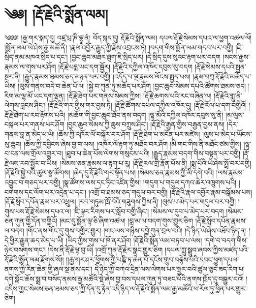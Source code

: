 \chapter{༄༅། །རྡོ་རྗེའི་སྨོན་ལམ།}༄༅༅། །རྒྱ་གར་སྐད་དུ། བཛྲ་པྲ་ཎི་དྷཱ་ནཾ། བོད་སྐད་དུ། རྡོ་རྗེའི་སྨོན་ལམ། དཔལ་རྡོ་རྗེ་སེམས་དཔའ་ལ་ཕྱག་འཚལ་ལོ། །སྨོན་ལམ་ཡེ་ཤེས་རྒྱ་མཚོ་ནི། །རྣལ་འབྱོར་རྒྱུད་ཀྱི་རྗེས་འབྲངས་ཏེ། །བདག་གིས་སྨོན་ལམ་གདབ་པར་བགྱི། །ཇི་སྲིད་ནམ་མཁའ་སྲིད་པ་དང་། །བྱང་ཆུབ་མཐར་ཐུག་ཇི་སྲིད་པར། །དེ་སྲིད་དུས་སུའང་རྟག་པར་བདག །སངས་རྒྱས་རྣམས་ལ་གུས་པར་ཤོག །རྡོ་རྗེ་པདྨ་ཡང་དག་སྦྱོར། །རྡོ་རྗེའི་དཀྱིལ་འཁོར་དབུས་སུ་བདག །རྡོ་རྗེ་སེམས་དཔའི་སྤྱན་སྔར་ནི། །རྒྱུད་རྣམས་ཐམས་ཅད་མཉན་པར་བགྱི། །འདོད་པ་ལྔ་རྣམས་ལོངས་སྤྱད་པས། །རྣམ་བཀྲ་རྡོ་རྗེའི་མཆོད་པ་ཡིས། །ལུས་གནས་བདེ་བ་ཆེན་པོ་ལ། །སྐྱེ་བ་ཀུན་ཏུ་མཆོད་པར་ཤོག །བྱང་ཆུབ་སེམས་དཔའི་ཚོགས་ཐམས་ཅད། །རིག་མ་ལྷ་མོ་ཡང་དག་ལྡན། །རྡོ་རྗེ་ཐེག་པར་གནས་སེམས་ཀྱིས། །རྡོ་རྗེ་ཆགས་པའི་རང་བཞིན་ལ། །རྡོ་རྗེའི་གླུ་ནི་ལེགས་བླངས་ཤིང་། །རྡོ་རྗེའི་གར་གྱིས་གར་བྱས་ཏེ། །རྡོ་རྗེ་ཚོགས་དཔལ་དཀྱིལ་འཁོར་དུ། །རྡོ་རྗེ་རོལ་པ་དག་བགྱིའོ། །རྡོ་རྗེ་ཐེག་པ་རབ་རྟོགས་པའི། །མཆོག་གི་བྱང་ཆུབ་ཐོབ་ནས་བདག །ལྷ་མོའི་དཀྱིལ་འཁོར་དབུས་སུ་ནི། །མ་ལུས་བསྐལ་པར་གནས་པར་ཤོག །བྱང་ཆུབ་སེམས་ཀྱི་ཆུས་བཀྲུས་ཤིང་། །རྡོ་རྗེའི་རྒྱན་གྱིས་བརྒྱན་བྱས་ནས། །དེར་གནས་བླ་ན་མེད་པ་ཡི། །ཆོས་ཀྱི་འཁོར་ལོ་བསྐོར་བར་ཤོག །རྡོ་རྗེ་ཐེག་པ་མངོན་པར་མཛེས། །ལུས་པ་མེད་པ་ཡོངས་སུ་ཆུབ། །ཆོས་ཀྱི་དབྱིངས་ཞེས་བྱ་བ་ལས། །འཁོར་ལོ་རྟག་ཏུ་མཐོང་བར་ཤོག །མི་གང་གིས་ནི་མཐོང་ཙམ་གྱིས། །ལྟ་བ་ངན་ལས་གྲོལ་འགྱུར་བ། །ཐུབ་པ་ཆེན་པོས་ལེགས་གསུངས་པའི། །རྒྱུད་རྣམས་བདག་གིས་བསྟན་པར་བགྱི། །རྡོ་རྗེ་ལས་རབ་སྦྱོར་བ་ཡིས། །སེམས་ཅན་རྣམས་ལ་རྟག་པ་རུ། །རྡོ་རྗེ་རལ་གྲི་རྣོན་པོས་ནི། །སྨྲ་པོའི་ཡེ་ཤེས་སྤྲོ་བར་བགྱི། །རྡོ་རྗེའི་སྐྱེ་བའི་ཚུལ་སྣ་ཚོགས། །ཆེད་དུ་རྡོ་རྗེའི་གར་སྟོན་པས། །སེམས་ཅན་རྣམས་ཀྱི་མི་དགེ་བའི། །ལས་རྣམས་འབྱུང་བ་གཅད་པར་བགྱི། །སྣ་ཚོགས་ལས་དང་ཏིང་འཛིན་གྱིས། །གདུག་པ་གདུལ་དཀའ་ཆེར་འཁྲུགས་པའི། །བགེགས་དང་ལོག་པར་འདྲེན་པ་དང་། །འགྲོ་བ་ཐམས་ཅད་གདུལ་བར་བགྱི། །རྡོ་རྗེའི་རྣལ་འབྱོར་རྣམ་བསྒོམས་པས། །རྡོ་རྗེ་སློབ་དཔོན་རྣམ་པར་འཕྲུལ། །རབ་གཏུམ་ཁྲོ་བོའི་གཟུགས་ཀྱིས་ནི། །ལུས་པ་མེད་པར་གདུལ་བར་བགྱི། །
གུས་པས་རྡོ་རྗེ་སེམས་དཔའ་ལ། །ཇི་ལྟར་རིགས་པར་སློབ་བགྱི་ཞིང་། །སེམས་ལ་དུབ་པ་མེད་པར་བདག །སེམས་ཅན་ཀུན་གྱི་དོན་བགྱིའོ། །མང་དུ་སྨོན་ལྟ་ཅི་ཞིག་འཚལ། །བླ་མ་ལ་བདག་གུས་གྱུར་ཅིག །རྡོ་རྗེ་སློབ་དཔོན་རྣམས་ལ་བདག །གོང་ནས་གོང་དུ་གུས་བགྱིར་གྱུར། །གང་ལས་གཉིས་དབྱེ་ཀུན་བྲལ་བའི། །དེ་ཉིད་ཡེ་ཤེས་འཐོབ་ཉིད་ན། །དེ་ཕྱིར་རྒྱུན་ཆད་མེད་པ་ཡི། །ཡིད་ཀྱིས་གུས་པ་ཁོ་ནར་ཤོག །རྡོ་རྗེའི་སྨོན་ལམ་བཏབ་པ་ལས། །དགེ་བ་བདག་གིས་ཉེར་བསགས་གང་། །དེས་ནི་རྡོ་རྗེ་ལྟ་བུ་ཡི། །འགྲོ་ཀུན་རྡོ་རྗེར་སྣང་གྱུར་ཅིག །དཔལ་ཀླུ་སྒྲུབ་ཞབས་ཀྱིས་མཛད་པའི་རྡོ་རྗེའི་སྨོན་ལམ་རྫོགས་སོ།། །།རྒྱ་གར་ཤར་ཕྱོགས་ཀྱི་པཎྜི་ཏ་ཆེན་པོ་དངོས་གྲུབ་བརྙེས་པའི་དབང་ཕྱུག་དཔལ་ནགས་ཀྱི་རིན་ཆེན་གྱི་ཞལ་སྔ་ནས་དང་། དེ་ཉིད་ཀྱི་བཀའ་དྲིན་ལས་ལེགས་པར་སྦྱར་བའི་ཚུལ་ཅུང་ཟད་རིག་པ། དགེ་སློང་ཆོས་སྨྲ་བ་བསོད་ནམས་རྒྱ་མཚོའི་སྡེ་ཞེས་བྱ་བས་དཔལ་ཀུན་ཏུ་བཟང་པོའི་ནགས་ཁྲོད་དུ་བསྒྱུར་བའོ། །འདིས་ཀྱང་སེམས་ཅན་ཐམས་ཅད་ཀྱི་དོན་དུ་རྟེན་འདི་ཉིད་ལ་རྡོ་རྗེའི་སྨོན་ལམ་རྒྱ་མཚོའི་ཕ་རོལ་ཏུ་ཕྱིན་པར་གྱུར་ཅིག། 